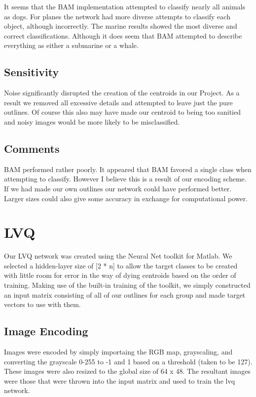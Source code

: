 \documentclass{article}
\begin{document}
It seems that the BAM implementation attempted to classify nearly all animals
as dogs. For planes the network had more diverse attempts to classify each
object, although incorrectly. The marine results showed the most diverse and
correct classifications. Although it does seem that BAM attempted to describe
everything as either a submarine or a whale.

\subsection{Sensitivity}
Noise significantly disrupted the creation of the centroids in our Project.
As a result we removed all excessive details and attempted to leave just
the pure outlines. Of course this also may have made our centroid to being
too sanitied and noisy images would be more likely to be misclassified.

\subsection{Comments}
BAM performed rather poorly. It appeared that BAM favored a single class when
attempting to classify. However I believe this is a result of our encoding 
scheme. If we had made our own outlines our network could have performed 
better. Larger sizes could also give some accuracy in exchange for computational
power. 

\section{LVQ}
Our LVQ network was created using the Neural Net toolkit for Matlab. We selected a hidden-layer size of [2 * n] to allow the target classes to be created with little room for error in the way of dying centroids based on the order of training. Making use of the built-in training of the toolkit, we simply constructed an input matrix consisting of all of our outlines for each group and made target vectors to use with them. 
\subsection{Image Encoding}
Images were encoded by simply importaing the RGB map, grayscaling, and converting the grayscale 0-255 to -1 and 1 based on a threshold (taken to be 127). These images were also resized to the global size of 64 x 48. The resultant images were those that were thrown into the input matrix and used to train the lvq network.
\end{document}
